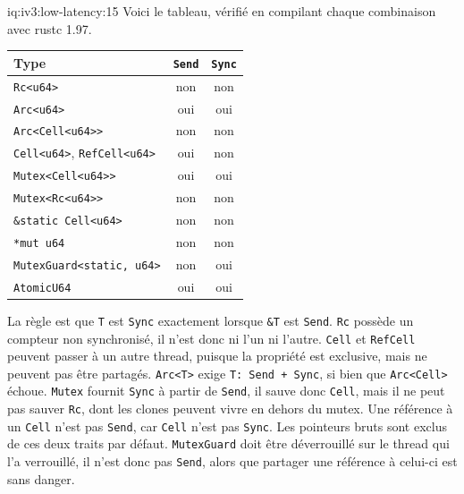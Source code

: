 \begin{solution}{iq:iv3:low-latency:15}
Voici le tableau, vérifié en compilant chaque combinaison avec rustc 1.97.

\begin{center}\small
\begin{tabular}{lcc}
Type & \texttt{Send} & \texttt{Sync}\\\hline
\texttt{Rc<u64>} & non & non\\
\texttt{Arc<u64>} & oui & oui\\
\texttt{Arc<Cell<u64>{}>} & non & non\\
\texttt{Cell<u64>}, \texttt{RefCell<u64>} & oui & non\\
\texttt{Mutex<Cell<u64>{}>} & oui & oui\\
\texttt{Mutex<Rc<u64>{}>} & non & non\\
\texttt{\&\textquotesingle{}static Cell<u64>} & non & non\\
\texttt{*mut u64} & non & non\\
\texttt{MutexGuard<\textquotesingle{}static, u64>} & non & oui\\
\texttt{AtomicU64} & oui & oui
\end{tabular}
\end{center}

La règle est que \texttt{T} est \texttt{Sync} exactement lorsque \texttt{\&T} est \texttt{Send}. \texttt{Rc} possède un compteur non synchronisé, il n'est donc ni l'un ni l'autre. \texttt{Cell} et \texttt{RefCell} peuvent passer à un autre thread, puisque la propriété est exclusive, mais ne peuvent pas être partagés. \texttt{Arc<T>} exige \texttt{T: Send + Sync}, si bien que \texttt{Arc<Cell>} échoue. \texttt{Mutex} fournit \texttt{Sync} à partir de \texttt{Send}, il sauve donc \texttt{Cell}, mais il ne peut pas sauver \texttt{Rc}, dont les clones peuvent vivre en dehors du mutex. Une référence à un \texttt{Cell} n'est pas \texttt{Send}, car \texttt{Cell} n'est pas \texttt{Sync}. Les pointeurs bruts sont exclus de ces deux traits par défaut. \texttt{MutexGuard} doit être déverrouillé sur le thread qui l'a verrouillé, il n'est donc pas \texttt{Send}, alors que partager une référence à celui-ci est sans danger.

\end{solution}

